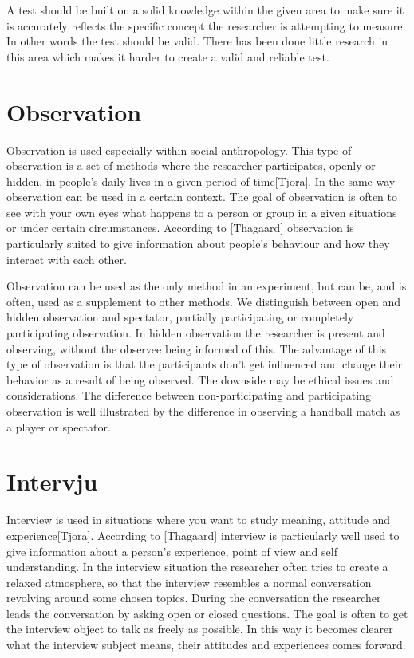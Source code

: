 \bigskip\noindent
A test should be built on a solid knowledge within the given area to make sure it is accurately reflects the specific concept the researcher is attempting to measure. In other words the test should be valid. There has been done little research in this area which makes it harder to create a valid and reliable test.

\section{Observation}
Observation is used especially within social anthropology. This type of observation is a set of methods where the researcher participates, openly or hidden, in people's daily lives in a given period of time[Tjora]. In the same way observation can be used in a certain context. The goal of observation is often to see with your own eyes what happens to a person or group in a given situations or under certain circumstances. According to [Thagaard] observation is particularly suited to give information about people's behaviour and how they interact with each other. 

\bigskip\noindent
Observation can be used as the only method in an experiment, but can be, and is often, used as a supplement to other methods. We distinguish between open and hidden observation and spectator, partially participating or completely participating observation. In hidden observation the researcher is present and observing, without the observee being informed of this. The advantage of this type of observation is that the participants don't get influenced and change their behavior as a result of being observed. The downside may be ethical issues and considerations. The difference between non-participating and participating observation is well illustrated by the difference in observing a handball match as a player or spectator. 
\section{Intervju}
Interview is used in situations where you want to study meaning, attitude and experience[Tjora]. According to [Thagaard] interview is particularly well used to give information about a person's experience, point of view and self understanding. In the interview situation the researcher often tries to create a relaxed atmosphere, so that the interview resembles a normal conversation revolving around some chosen topics. During the conversation the researcher leads the conversation by asking open or closed questions. The goal is often to get the interview object to talk as freely as possible. In this way it becomes clearer what the interview subject means, their attitudes and experiences comes forward. 

